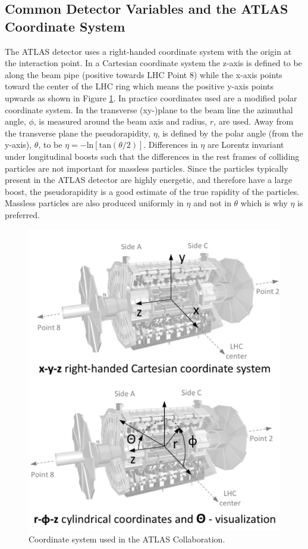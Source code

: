 \subsection{Common Detector Variables and the ATLAS Coordinate System}
The ATLAS detector uses a right-handed coordinate system with the origin at the interaction point.  In a Cartesian coordinate system the z-axis is defined to be along the beam pipe (positive towards LHC Point 8) while the x-axis points toward the center of the LHC ring which means the positive y-axis points upwards as shown in Figure \ref{fig:ATLASCoords}.  In practice coordinates used are a modified polar coordinate system.  In the transverse (xy-)plane to the beam line the azimuthal angle, $\phi$, is measured around the beam axis and radius, $r$, are used.  Away from the transverse plane the pseudorapidity, $\eta$, is defined by the polar angle (from the y-axis), $\theta$, to be $\eta= -\text{ln}[\text{tan}(\theta/2)]$.  Differences in $\eta$ are Lorentz invariant under longitudinal boosts such that the differences in the rest frames of colliding particles are not important for massless particles.  Since the particles typically present in the ATLAS detector are highly energetic, and therefore have a large boost, the pseudorapidity is a good estimate of the true rapidity of the particles.  Massless particles are also produced uniformly in $\eta$ and not in $\theta$  which is why $\eta$ is preferred.

\begin{figure}[ht!]
	\centering
	\includegraphics[width=0.5\columnwidth]{../ThesisImages/LHCImages/ATLASCoords.png}
	\caption[Coordinate system used in the ATLAS Collaboration.]{Coordinate system used in the ATLAS Collaboration\cite{ATLASCoords}.
	}
	\label{fig:ATLASCoords}
\end{figure}

